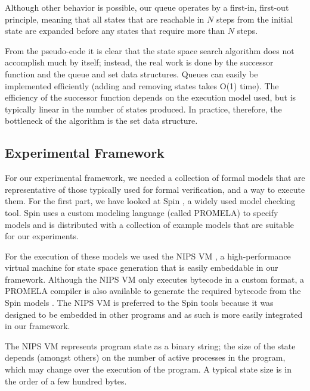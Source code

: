 \documentclass{acm_proc_article-sp}
\begin{document}
Although other behavior is possible, our queue operates by a first-in,
first-out principle, meaning that all states that are reachable in $N$ steps
from the initial state are expanded before any states that require more than
$N$ steps.

From the pseudo-code it is clear that the state space search algorithm does not
accomplish much by itself; instead, the real work is done by the successor
function and the queue and set data structures. Queues can easily be
implemented efficiently (adding and removing states takes O(1) time).
The efficiency of the successor function depends on the execution model used,
but is typically linear in the number of states produced. In practice,
therefore, the bottleneck of the algorithm is the set data structure.

\subsection{Experimental Framework}
For our experimental framework, we needed a collection of formal models that are
representative of those typically used for formal verification, and a way to
execute them. For the first part, we have looked at Spin \cite{holzmann2004smc},
a widely used model checking tool.
Spin uses a custom modeling language (called PROMELA) to specify models and is
distributed with a collection of example models that are suitable for our
experiments.

For the execution of these models we used the NIPS VM \cite{weber2007evm}, a
high-performance virtual machine for state space generation that is easily
embeddable in our framework. Although the NIPS VM only executes bytecode in a
custom format, a PROMELA compiler is also available to generate the required
bytecode from the Spin models \cite{nipsvm}. The NIPS VM is preferred to the
Spin tools because it was designed to be embedded in other programs and as
such is more easily integrated in our framework.

The NIPS VM represents program state as a binary string; the size of the state
depends (amongst others) on the number of active processes in the program,
which may change over the execution of the program.
A typical state size is in the order of a few hundred bytes.
\end{document}

